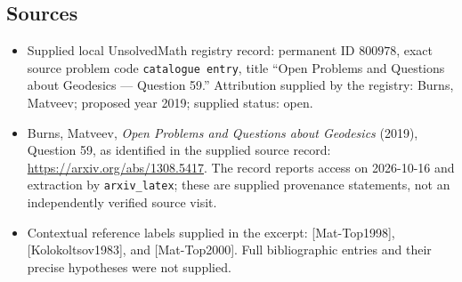 \documentclass[11pt]{article}
\begin{document}
\subsection{Sources}
\begin{itemize}
\item Supplied local UnsolvedMath registry record: permanent ID \(800978\), exact source problem code \texttt{catalogue entry}, title ``Open Problems and Questions about Geodesics --- Question 59.'' Attribution supplied by the registry: Burns, Matveev; proposed year 2019; supplied status: open.
\item Burns, Matveev, \emph{Open Problems and Questions about Geodesics} (2019), Question 59, as identified in the supplied source record: \url{https://arxiv.org/abs/1308.5417}. The record reports access on 2026-10-16 and extraction by \texttt{arxiv\_latex}; these are supplied provenance statements, not an independently verified source visit.
\item Contextual reference labels supplied in the excerpt: [Mat-Top1998], [Kolokoltsov1983], and [Mat-Top2000]. Full bibliographic entries and their precise hypotheses were not supplied.
\end{itemize}
\end{document}
